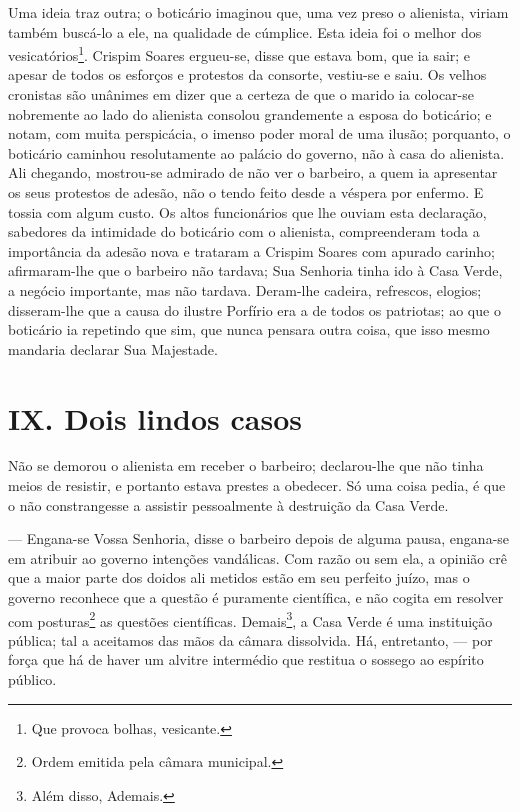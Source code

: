 Uma ideia traz outra; o boticário imaginou que, uma vez preso o
alienista, viriam também buscá-lo a ele, na qualidade de cúmplice. Esta
ideia foi o melhor dos vesicatórios\footnote{Que provoca bolhas,
  vesicante.}. Crispim Soares ergueu-se, disse que estava bom, que ia
sair; e apesar de todos os esforços e protestos da consorte, vestiu-se e
saiu. Os velhos cronistas são unânimes em dizer que a certeza de que o
marido ia colocar-se nobremente ao lado do alienista consolou
grandemente a esposa do boticário; e notam, com muita perspicácia, o
imenso poder moral de uma ilusão; porquanto, o boticário caminhou
resolutamente ao palácio do governo, não à casa do alienista. Ali
chegando, mostrou-se admirado de não ver o barbeiro, a quem ia
apresentar os seus protestos de adesão, não o tendo feito desde a
véspera por enfermo. E tossia com algum custo. Os altos funcionários que
lhe ouviam esta declaração, sabedores da intimidade do boticário com o
alienista, compreenderam toda a importância da adesão nova e trataram a
Crispim Soares com apurado carinho; afirmaram-lhe que o barbeiro não
tardava; Sua Senhoria tinha ido à Casa Verde, a negócio importante, mas
não tardava. Deram-lhe cadeira, refrescos, elogios; disseram-lhe que a
causa do ilustre Porfírio era a de todos os patriotas; ao que o
boticário ia repetindo que sim, que nunca pensara outra coisa, que isso
mesmo mandaria declarar Sua Majestade.

\chapter{IX. Dois lindos casos }

Não se demorou o alienista em receber o barbeiro; declarou-lhe que não
tinha meios de resistir, e portanto estava prestes a obedecer. Só uma
coisa pedia, é que o não constrangesse a assistir pessoalmente à
destruição da Casa Verde.

--- Engana-se Vossa Senhoria, disse o barbeiro depois de alguma pausa,
engana-se em atribuir ao governo intenções vandálicas. Com razão ou sem
ela, a opinião crê que a maior parte dos doidos ali metidos estão em seu
perfeito juízo, mas o governo reconhece que a questão é puramente
científica, e não cogita em resolver com posturas\footnote{Ordem emitida
  pela câmara municipal.} as questões científicas. Demais\footnote{Além
  disso, Ademais.}, a Casa Verde é uma instituição pública; tal a
aceitamos das mãos da câmara dissolvida. Há, entretanto, --- por força
que há de haver um alvitre intermédio que restitua o sossego ao espírito
público.

